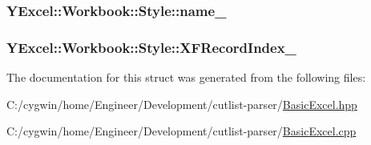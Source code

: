 \subsubsection[{name\+\_\+}]{ Y\+Excel\+::\+Workbook\+::\+Style\+::name\+\_\+}\label{struct_y_excel_1_1_workbook_1_1_style_a8e52f27abe416c51e6c6afc6c8381a4e}
\hypertarget{struct_y_excel_1_1_workbook_1_1_style_a655562c17f5dabc7cd5303aa9c3e0485}{}
\subsubsection[{X\+F\+Record\+Index\+\_\+}]{ Y\+Excel\+::\+Workbook\+::\+Style\+::\+X\+F\+Record\+Index\+\_\+}\label{struct_y_excel_1_1_workbook_1_1_style_a655562c17f5dabc7cd5303aa9c3e0485}


The documentation for this struct was generated from the following files\+:\begin{DoxyCompactItemize}
\item 
C\+:/cygwin/home/\+Engineer/\+Development/cutlist-\/parser/\hyperlink{_basic_excel_8hpp}{Basic\+Excel.\+hpp}\item 
C\+:/cygwin/home/\+Engineer/\+Development/cutlist-\/parser/\hyperlink{_basic_excel_8cpp}{Basic\+Excel.\+cpp}\end{DoxyCompactItemize}
